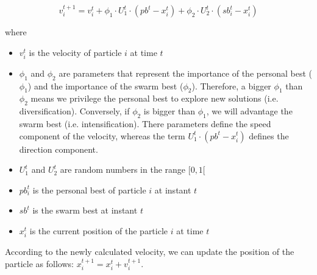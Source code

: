         $$v_i^{t+1} = v_i^t + \phi_1 \cdot U_1^t \cdot (pb^t - x_i^t) + \phi_2 \cdot U_2^t \cdot (sb_i^t - x_i^t)$$

        where 

        \begin{itemize}
            \item $v_i^t$ is the velocity of particle $i$ at time $t$
            \item $\phi_1$ and $\phi_2$ are parameters that represent the importance of the personal best ($\phi_1$) and the importance of the swarm best ($\phi_2$). Therefore, a bigger $\phi_1$ than $\phi_2$ means we privilege the personal best to explore new solutions (i.e. diversification). Conversely, if $\phi_2$ is bigger than $\phi_1$, we will advantage the swarm best (i.e. intensification). There parameters define the speed component of the velocity, whereas the term $U_1^t \cdot (pb^t - x_i^t)$ defines the direction component.
            \item $U_1^t$ and $U_2^t$ are random numbers in the range $[0, 1[$
            \item $pb_i^t$ is the personal best of particle $i$ at instant $t$
            \item $sb^t$ is the swarm best at instant $t$
            \item $x_i^t$ is the current position of the particle $i$ at time $t$
        \end{itemize}

        According to the newly calculated velocity, we can update the position of the particle as follows: $x_i^{t+1} = x_i^t + v_i^{t+1}$. \cite{psoDorigo}





